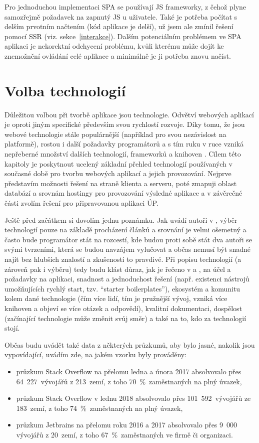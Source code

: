         Pro jednoduchou implementaci SPA se používají JS frameworky, z čehož plyne samozřejmě požadavek na zapnutý JS u uživatele. Také je potřeba počítat s delším prvotním načtením (kód aplikace je delší), už jsem ale zmínil řešení pomocí SSR (viz. sekce~\ref{interakce}). Dalším potenciálním problémem ve SPA aplikaci je nekorektní odchycení problému, kvůli kterému může dojít ke znemožnění ovládání celé aplikace a minimálně je ji potřeba znovu načíst.

\chapter{Volba technologií}\label{technologie}
Důležitou volbou při tvorbě aplikace jsou technologie. Odvětví webových aplikací je oproti jiným specifické především svou rychlostí rozvoje. Díky tomu, že jsou webové technologie stále populárnější (například pro svou nezávislost na platformě), rostou i další požadavky programátorů a s tím ruku v ruce vzniká nepřeberné množství dalších technologií, frameworků a knihoven \cite{moderni-webapps,moderni-webapps2}. Cílem této kapitoly je poskytnout ucelený základní přehled technologií používaných v současné době pro tvorbu webových aplikací a jejich provozování. Nejprve představím možnosti řešení na straně klienta a serveru, poté zmapuji oblast databází a srovnám hostingy pro provozování výsledné aplikace a v závěrečné části zvolím řešení pro připravovanou aplikaci ÚP.

Ještě před začátkem si dovolím jednu poznámku. Jak uvádí autoři v \cite{technologie1}, výběr technologií pouze na základě procházení článků a srovnání je velmi ošemetný a často bude programátor stát na rozcestí, kde budou proti sobě stát dva autoři se svými tvrzeními, která se budou navzájem vylučovat a občas nemusí být snadné najít bez hlubších znalostí a zkušeností to pravdivé. Při popisu technologií (a zároveň pak i výběru) tedy budu klást důraz, jak je řečeno v \cite{technologie1} a \cite{technologie2}, na účel a požadavky na aplikaci, snadnost a jednoduchost řešení (např. existenci nástrojů umožňujících rychlý start, tzv. \enquote{starter boilerplates}), ekosystém a komunitu kolem dané technologie (čím více lidí, tím je pružnější vývoj, vzniká více knihoven a objeví se více otázek a odpovědí), kvalitní dokumentaci, dospělost (začínající technologie může změnit svůj směr) a také na to, kdo za technologií stojí.

Občas budu uvádět také data z některých průzkumů, aby bylo jasné, nakolik jsou vypovídající, uvádím zde, na jakém vzorku byly prováděny:
\begin{itemize}
    \item průzkum Stack Overflow \cite{stack-stats17} na přelomu ledna a února 2017 absolvovalo přes 64~227~vývojářů z 213~zemí, z toho 70~\%~zaměstnaných na plný úvazek,
    \item průzkum Stack Overflow \cite{stack-stats18} v lednu 2018 absolvovalo přes 101~592~vývojářů ze 183~zemí, z toho 74~\%~zaměstnaných na plný úvazek,
    \item průzkum Jetbrains \cite{jetbrains-stats} na přelomu roku 2016 a 2017 absolvovalo přes 9~000 vývojářů z 20~zemí, z toho 67~\%~zaměstnaných ve firmě či organizaci.
\end{itemize}

